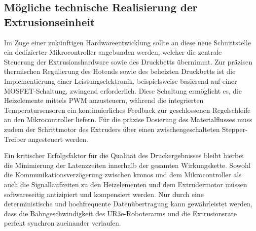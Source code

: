         \subsection{Mögliche technische Realisierung der Extrusionseinheit}
            Im Zuge einer zukünftigen Hardwareentwicklung sollte an diese neue Schnittstelle ein dedizierter Mikrocontroller angebunden werden, welcher die zentrale Steuerung der Extrusionshardware sowie des Druckbetts übernimmt.
            Zur präzisen thermischen Regulierung des Hotends sowie des beheizten Druckbetts ist die Implementierung einer Leistungselektronik, beispielsweise basierend auf einer \ac{MOSFET}-Schaltung, zwingend erforderlich.
            Diese Schaltung ermöglicht es, die Heizelemente mittels \ac{PWM} anzusteuern, während die integrierten Temperatursensoren ein kontinuierliches Feedback zur geschlossenen Regelschleife an den Mikrocontroller liefern.
            Für die präzise Dosierung des Materialflusses muss zudem der Schrittmotor des Extruders über einen zwischengeschalteten Stepper-Treiber angesteuert werden.

            Ein kritischer Erfolgsfaktor für die Qualität des Druckergebnisses bleibt hierbei die Minimierung der Latenzzeiten innerhalb der gesamten Wirkungskette.
            Sowohl die Kommunikationsverzögerung zwischen \ac{kronos} und dem Mikrocontroller als auch die Signallaufzeiten zu den Heizelementen und dem Extrudermotor müssen softwareseitig antizipiert und kompensiert werden.
            Nur durch eine deterministische und hochfrequente Datenübertragung kann gewährleistet werden, dass die Bahngeschwindigkeit des UR3e-Roboterarms und die Extrusionsrate perfekt synchron zueinander verlaufen.
